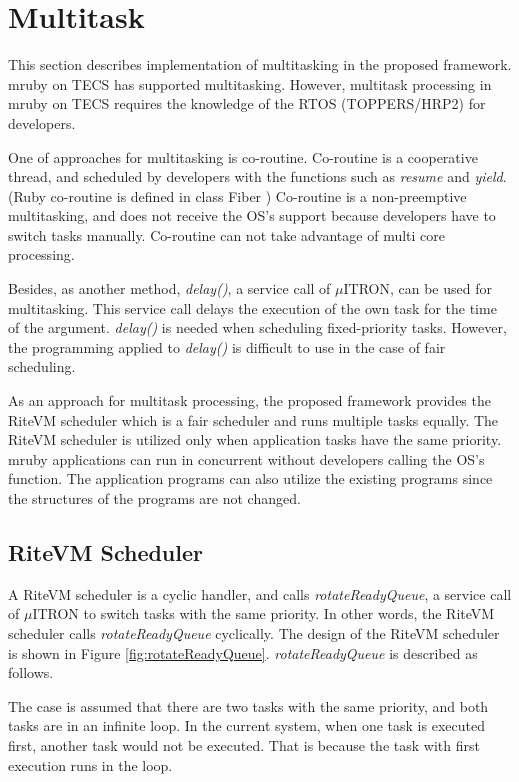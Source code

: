 \documentclass[a4j,12pt,oneside,openany,english]{jsbook}
\begin{document}
\section{Multitask}
\label{sec:Multitask}
This section describes implementation of multitasking in the proposed framework.
mruby on TECS has supported multitasking.
However, multitask processing in mruby on TECS requires the knowledge of the RTOS (TOPPERS/HRP2) for developers.

One of approaches for multitasking is co-routine.
Co-routine is a cooperative thread, and scheduled by developers with the functions such as {\it resume} and {\it yield}. 
(Ruby co-routine is defined in class Fiber \cite{url:co-routine})
Co-routine is a non-preemptive multitasking, and does not receive the OS's support because developers have to switch tasks manually.
Co-routine can not take advantage of multi core processing.

Besides, as another method, {\it delay()}, a service call of $\mu$ITRON, can be used for multitasking.
This service call delays the execution of the own task for the time of the argument.
{\it delay()} is needed when scheduling fixed-priority tasks.
However, the programming applied to {\it delay()} is difficult to use in the case of fair scheduling.

As an approach for multitask processing, the proposed framework provides the RiteVM scheduler which is a fair scheduler and runs multiple tasks equally.
The RiteVM scheduler is utilized only when application tasks have the same priority.
mruby applications can run in concurrent without developers calling the OS's function.
The application programs can also utilize the existing programs since the structures of the programs are not changed. 

\subsection{RiteVM Scheduler} 

A RiteVM scheduler is a cyclic handler, and calls {\it rotateReadyQueue}, a service call of $\mu$ITRON to switch tasks with the same priority.
In other words, the RiteVM scheduler calls {\it rotateReadyQueue} cyclically.
The design of the RiteVM scheduler is shown in Figure \ref{fig:rotateReadyQueue}. 
{\it rotateReadyQueue} is described as follows.

The case is assumed that there are two tasks with the same priority, and both tasks are in an infinite loop.
In the current system, when one task is executed first, another task would not be executed.
That is because the task with first execution runs in the loop.
\end{document}

